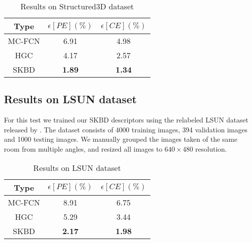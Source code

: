 \begin{table}[H]
\centering
\begin{tabular}{|c | c c |}
    \hline
    Type & $\epsilon[PE](\%)$ & $\epsilon[CE](\%)$ \\ [0.5 ex]
    \hline\hline
    MC-FCN & 6.91 & 4.98 \\
    HGC & 4.17 & 2.57 \\
    \hline
    SKBD & \textbf{1.89} & \textbf{1.34} \\
    \hline
\end{tabular}
\caption{Results on Structured3D dataset}
\label{table:structured3dperf}
\end{table}


\subsection{Results on LSUN dataset}
For this test we trained our SKBD descriptors using the relabeled LSUN dataset released by \cite{ren2017coarse}. The dataset consists of 4000 training images, 394 validation images and 1000 testing images. We manually grouped the images taken of the same room from multiple angles, and resized all images to \( 640 \times 480 \) resolution.

\begin{table}[H]
\centering
\begin{tabular}{|c | c c |}
    \hline
    Type & $\epsilon[PE](\%)$ & $\epsilon[CE](\%)$ \\ [0.5 ex]
    \hline\hline
    MC-FCN & 8.91 & 6.75 \\
    HGC & 5.29 & 3.44 \\
    \hline
    SKBD & \textbf{2.17} & \textbf{1.98} \\
    \hline
\end{tabular}
\caption{Results on LSUN dataset}
\label{table:lsunperf}
\end{table}



